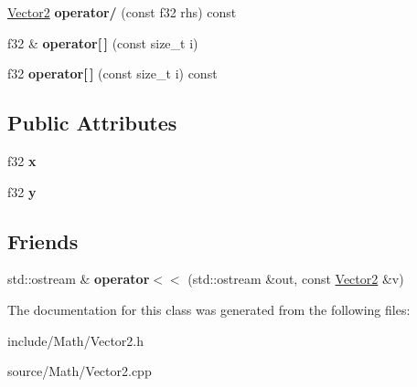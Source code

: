 \begin{DoxyCompactItemize}
\item 
\hyperlink{classDE_1_1Vector2}{Vector2} {\bfseries operator/} (const f32 rhs) const \hypertarget{classDE_1_1Vector2_ab5d6fcceca26f69712e032dce2655a06}{}\label{classDE_1_1Vector2_ab5d6fcceca26f69712e032dce2655a06}

\item 
f32 \& {\bfseries operator\mbox{[}$\,$\mbox{]}} (const size\+\_\+t i)\hypertarget{classDE_1_1Vector2_a3e871c7158f7a2063703488946de0a36}{}\label{classDE_1_1Vector2_a3e871c7158f7a2063703488946de0a36}

\item 
f32 {\bfseries operator\mbox{[}$\,$\mbox{]}} (const size\+\_\+t i) const \hypertarget{classDE_1_1Vector2_a8bf774fcd40e258a877b1bd2fbd98907}{}\label{classDE_1_1Vector2_a8bf774fcd40e258a877b1bd2fbd98907}

\end{DoxyCompactItemize}
\subsection*{Public Attributes}
\begin{DoxyCompactItemize}
\item 
f32 {\bfseries x}\hypertarget{classDE_1_1Vector2_a44ea79b12c321152c3b510bfcaad9118}{}\label{classDE_1_1Vector2_a44ea79b12c321152c3b510bfcaad9118}

\item 
f32 {\bfseries y}\hypertarget{classDE_1_1Vector2_a6701280d6402fdf8c8e2149267c60776}{}\label{classDE_1_1Vector2_a6701280d6402fdf8c8e2149267c60776}

\end{DoxyCompactItemize}
\subsection*{Friends}
\begin{DoxyCompactItemize}
\item 
std\+::ostream \& {\bfseries operator$<$$<$} (std\+::ostream \&out, const \hyperlink{classDE_1_1Vector2}{Vector2} \&v)\hypertarget{classDE_1_1Vector2_a077027eaf020d591b263437d2949c850}{}\label{classDE_1_1Vector2_a077027eaf020d591b263437d2949c850}

\end{DoxyCompactItemize}


The documentation for this class was generated from the following files\+:\begin{DoxyCompactItemize}
\item 
include/\+Math/Vector2.\+h\item 
source/\+Math/Vector2.\+cpp\end{DoxyCompactItemize}

